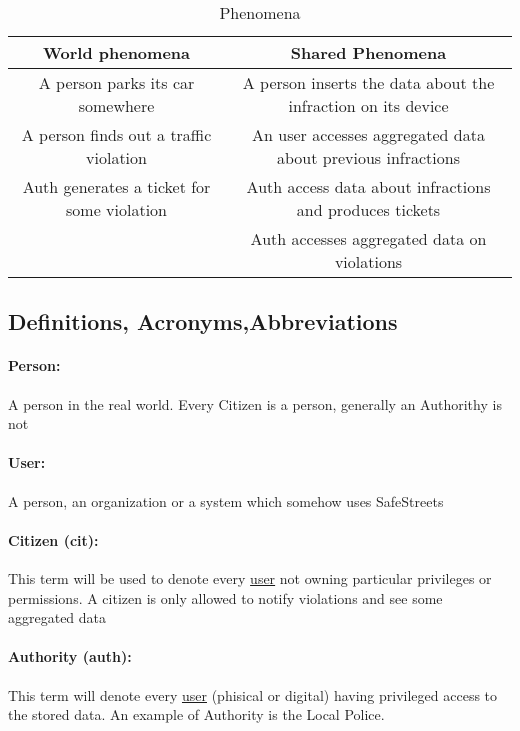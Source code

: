 \documentclass{article}
\begin{document}
		\begin{table}[h]
			\begin{center}
				\caption{Phenomena}
				\small
				\label{Phenomena}
				\begin{tabular}{c|c}
					\textbf{World phenomena}&\textbf{Shared Phenomena}\\
					\hline
					A person parks its car somewhere&A person inserts the data about the infraction on its device\\
					A person finds out a traffic violation&An user accesses aggregated data about previous infractions\\
					\hline
					Auth generates a ticket for some violation&Auth access data about infractions and produces tickets\\
					&Auth accesses aggregated data on violations\\
					
				\end{tabular}
			\end{center}
		\end{table}
		
	\subsection{Definitions, Acronyms,Abbreviations} \label{definitions}
		\paragraph{Person:}A person in the real world. Every Citizen is a person, generally an Authorithy is not
		\paragraph{User:}A person, an organization or a system which somehow uses SafeStreets
		\paragraph{Citizen (cit):} This term will be used to denote every \underline{user} not owning particular privileges or permissions. A citizen is only allowed to notify violations and see some aggregated data
		\paragraph{Authority (auth):} This term will denote every \underline{user} (phisical or digital) having privileged access to the stored data. An example of Authority is the Local Police.
\end{document}
